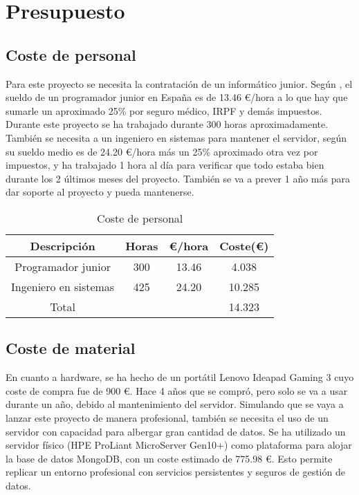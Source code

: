 \section{Presupuesto}
\subsection*{Coste de personal}
Para este proyecto se necesita la contratación de un informático junior. Según \cite{sueldo-junior}, el sueldo de un programador junior en España es de 13.46 €/hora a lo que hay que
sumarle un aproximado 25\% por seguro médico, IRPF y demás impuestos. Durante este proyecto se ha trabajado durante 300 horas aproximadamente. También se necesita a un ingeniero en sistemas para mantener el servidor, según \cite{sueldo-sistemas} su sueldo medio es de 24.20 €/hora más un 25\% aproximado otra vez por impuestos, y ha trabajado 1 hora al día para verificar que todo estaba bien durante los 2 últimos meses del proyecto. También se va a prever 1 año más para dar soporte al proyecto y pueda mantenerse.

\begin{table}[h!]
\centering
\begin{tabular}{|c|c|c|c|}
\hline
\textbf{Descripción} & \textbf{Horas} & \textbf{€/hora} & \textbf{Coste(€)} \\
\hline
Programador junior & 300 & 13.46 & 4.038 \\
\hline
Ingeniero en sistemas & 425 & 24.20 & 10.285 \\
\hline
Total &  &  & 14.323 \\
\hline
\end{tabular}
\caption{Coste de personal}
\label{tab:ejemplo}
\end{table}

\subsection*{Coste de material}
En cuanto a hardware, se ha hecho de un portátil Lenovo Ideapad Gaming 3 cuyo coste de compra fue de 900 €. Hace 4 años que se compró, pero solo se va a usar durante un año, debido al mantenimiento del servidor. Simulando que se vaya a lanzar este proyecto de manera profesional, también se necesita el uso de un servidor con capacidad para albergar gran cantidad de datos. Se ha utilizado un servidor físico (HPE ProLiant MicroServer Gen10+) como plataforma para alojar la base de datos MongoDB, con un coste estimado de 775.98 €. Esto permite replicar un entorno profesional con servicios persistentes y seguros de gestión de datos.


